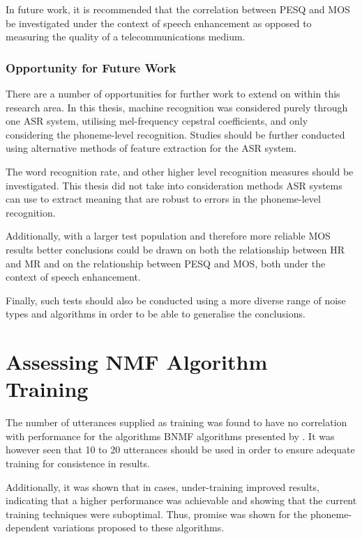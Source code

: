 In future work, it is recommended that the correlation between \ac{PESQ}
and \ac{MOS} be investigated under the context of speech enhancement
as opposed to measuring the quality of a telecommunications medium.


\subsubsection*{Opportunity for Future Work}

There are a number of opportunities for further work to extend on
within this research area. In this thesis, machine recognition was
considered purely through one \ac{ASR} system, utilising mel-frequency
cepstral coefficients, and only considering the phoneme-level recognition.
Studies should be further conducted using alternative methods of feature
extraction for the \ac{ASR} system.

The word recognition rate, and other higher level recognition measures
should be investigated. This thesis did not take into consideration
methods \ac{ASR} systems can use to extract meaning that are robust
to errors in the phoneme-level recognition.

Additionally, with a larger test population and therefore more reliable
\ac{MOS} results better conclusions could be drawn on both the relationship
between \ac{HR} and \ac{MR} and on the relationship between \ac{PESQ}
and \ac{MOS}, both under the context of speech enhancement.

Finally, such tests should also be conducted using a more diverse
range of noise types and algorithms in order to be able to generalise
the conclusions.


\section{Assessing \acl{NMF} Algorithm Training}

The number of utterances supplied as training was found to have no
correlation with performance for the algorithms \ac{BNMF} algorithms
presented by \citet{mohammadiha2013supervised}. It was however seen
that 10 to 20 utterances should be used in order to ensure adequate
training for consistence in results.

Additionally, it was shown that in cases, under-training improved
results, indicating that a higher performance was achievable and showing
that the current training techniques were suboptimal. Thus, promise
was shown for the phoneme-dependent variations proposed to these algorithms.


